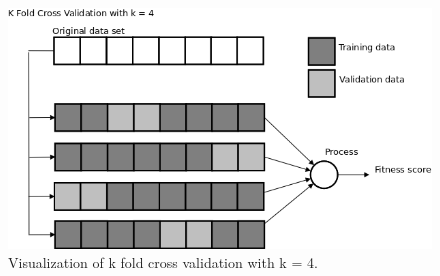 %
%
%
\begin{figure}
    \centering
    \includegraphics[width=\textwidth,height=\textheight,keepaspectratio]{figures/kfold.png}
    \caption{Visualization of k fold cross validation with k = 4.}
    \label{fig:kfold}
\end{figure}
%
